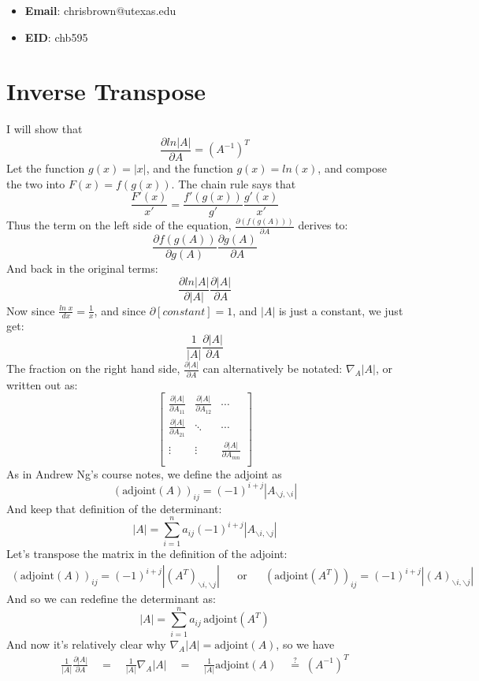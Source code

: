 \documentclass[11pt]{report}
\begin{document}
\begin{itemize}
  \item \textbf{Email}: chrisbrown@utexas.edu
  \item \textbf{EID}: chb595
\end{itemize}

\section{Inverse Transpose}

I will show that
\[ \frac{ \partial ln|A| }{ \partial A } = (A^{-1})^T \]
Let the function $g(x) = |x|$, and the function $g(x) = ln(x)$, and compose the two into $F(x) = f(g(x))$. The chain rule says that
\[\frac{F'(x)}{x'} = \frac{f'(g(x))}{g'} \frac{g'(x)}{x'}\]
Thus the term on the left side of the equation, \(\frac{\partial(f(g(A)))}{\partial A}\) derives to:
\[ \frac{\partial f(g(A))}{\partial g(A)} \frac{\partial g(A)}{\partial A} \]
And back in the original terms:
\[ \frac{\partial ln|A|}{\partial |A|} \frac{\partial |A|}{\partial A} \]
Now since $\frac{ln\;x}{dx} = \frac{1}{x}$, and since $\partial [constant] = 1$, and $|A|$ is just a constant, we just get:
\[ \frac{1}{|A|} \frac{\partial |A|}{\partial A} \]
The fraction on the right hand side, $\frac{\partial |A|}{\partial A}$ can alternatively be notated:
$\nabla_A |A|$, or written out as:
\[
\begin{bmatrix}
  \frac{\partial |A|}{\partial A_{11}} & \frac{\partial |A|}{\partial A_{12}} & \cdots \\
  \frac{\partial |A|}{\partial A_{21}} & \ddots & \cdots \\
  \vdots & \vdots & \frac{\partial |A|}{\partial A_{mn}} \\
\end{bmatrix}
\]
As in Andrew Ng's course notes, we define the adjoint as
\[(\text{adjoint}(A))_{ij} = (-1)^{i+j}|A_{\backslash j,\backslash i}|\]
And keep that definition of the determinant:
\[|A| = \sum^n_{i=1} a_{ij} (-1)^{i+j}|A_{\backslash i,\backslash j}|\]
Let's transpose the matrix in the definition of the adjoint:
\begin{align*}
  (\text{adjoint}(A))_{ij} = (-1)^{i+j}|(A^T)_{\backslash i,\backslash j}|
  & & \text{or} & &
  (\text{adjoint}(A^T))_{ij} = (-1)^{i+j}|(A)_{\backslash i,\backslash j}|
\end{align*}
And so we can redefine the determinant as:
\[|A| = \sum^n_{i=1} a_{ij}\, \text{adjoint}(A^T)\]
And now it's relatively clear why $\nabla_A |A| = \text{adjoint}(A)$, so we have
\begin{align*}
  \frac{1}{|A|} \frac{\partial |A|}{\partial A}
  \quad=\quad
  \frac{1}{|A|} \nabla_A |A|
  \quad=\quad
  \frac{1}{|A|} \text{adjoint}(A) 
  \quad \overset{?}{=}\; (A^{-1})^T
\end{align*}
\end{document}
